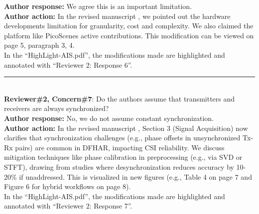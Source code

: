 \documentclass[Afour,sageh,times]{sagej}
\begin{document}
\textbf{Author response:} We agree this is an important limitation.\\
\textbf{Author action:} In the revised manuscript , we pointed out the hardware developments limitation for granularity, cost and complexity. We also claimed the platform like PicoScenes active contributions. This modification can be viewed on page 5, paragraph 3, 4.\\

\textcolor{myOrange}{
In the “HighLight-AIS.pdf”, the modifications made are highlighted and annotated with “Reviewer 2: Response 6”.  }\\

\color{gray}\rule{\linewidth}{1pt}\normalcolor\\

\textcolor{myGreen}{ \textbf{Reviewer\#2, Concern\#7}: Do the authors assume that transmitters and receivers are always synchronized?}  \\

\textbf{Author response:} No, we do not assume constant synchronization.\\
\textbf{Author action:} In the revised manuscript , Section 3 (Signal Acquisition) now clarifies that synchronization challenges (e.g., phase offsets in unsynchronized Tx-Rx pairs) are common in DFHAR, impacting CSI reliability. We discuss mitigation techniques like phase calibration in preprocessing (e.g., via SVD or STFT), drawing from studies where desynchronization reduces accuracy by 10-20\% if unaddressed. This is visualized in new figures (e.g., Table 4 on page 7 and Figure 6 for hybrid workflows on page 8).\\

\textcolor{myOrange}{
In the “HighLight-AIS.pdf”, the modifications made are highlighted and annotated with “Reviewer 2: Response 7”.  }\\
\end{document}
